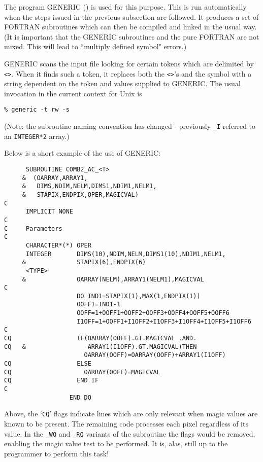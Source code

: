 The program GENERIC () is used for this purpose. This is run automatically
when the steps issued in the previous subsection are followed. It produces a
set of FORTRAN subroutines which can then be compiled and linked in the usual
way. (It is important that the GENERIC subroutines and the pure FORTRAN are not
mixed. This will lead to ``multiply defined symbol" errors.)

GENERIC scans the input file looking for certain tokens which are delimited
by {\tt <>}. When it finds such a token, it replaces both the {\tt <>}'s and
the symbol with a string dependent on the token and values supplied to
GENERIC. The usual invocation in the current context for Unix is

\begin{myquote}
\begin{verbatim}
% generic -t rw -s
\end{verbatim}
\end{myquote}

(Note: the subroutine naming convention has changed - previously {\tt\_I}
referred to an {\tt INTEGER*2} array.)

Below is a short example of the use of GENERIC:

\begin{myquote}
\begin{verbatim}
      SUBROUTINE COMB2_AC_<T>
     &  (OARRAY,ARRAY1,
     &   DIMS,NDIM,NELM,DIMS1,NDIM1,NELM1,
     &   STAPIX,ENDPIX,OPER,MAGICVAL)
C
      IMPLICIT NONE
C
C     Parameters
C
      CHARACTER*(*) OPER
      INTEGER       DIMS(10),NDIM,NELM,DIMS1(10),NDIM1,NELM1,
     &              STAPIX(6),ENDPIX(6)
      <TYPE>
     &              OARRAY(NELM),ARRAY1(NELM1),MAGICVAL
C
                    DO IND1=STAPIX(1),MAX(1,ENDPIX(1))
                    OOFF1=IND1-1
                    OOFF=1+OOFF1+OOFF2+OOFF3+OOFF4+OOFF5+OOFF6
                    I1OFF=1+OOFF1+I1OFF2+I1OFF3+I1OFF4+I1OFF5+I1OFF6
C
CQ                  IF(OARRAY(OOFF).GT.MAGICVAL .AND.
CQ   &                 ARRAY1(I1OFF).GT.MAGICVAL)THEN
                      OARRAY(OOFF)=OARRAY(OOFF)+ARRAY1(I1OFF)
CQ                  ELSE
CQ                    OARRAY(OOFF)=MAGICVAL
CQ                  END IF
C
                  END DO
\end{verbatim}
\end{myquote}

Above, the `{\tt CQ}' flags indicate lines which are only relevant when magic
values are known to be present. The remaining code processes each pixel
regardless of its value. In the {\tt \_WQ} and {\tt \_RQ} variants of the
subroutine the flags would be removed, enabling the magic value test to be
performed. It is, alas, still up to the programmer to perform this task!

